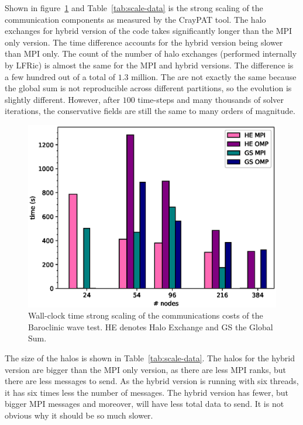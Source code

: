 Shown in figure~\ref{fig:comms_scale} and Table~\ref{tab:scale-data}
is the strong scaling of the communication components as measured by
the CrayPAT tool. The halo exchanges for hybrid version of the code
takes significantly longer than the MPI only version. The time
difference accounts for the hybrid version being slower than MPI only.
The count of the number of halo exchanges (performed internally by
LFRic) is almost the same for the MPI and hybrid versions. The
difference is a few hundred out of a total of $1.3$ million. The are
not exactly the same because the global sum is not reproducible across
different partitions, so the evolution is slightly different. However,
after $100$ time-steps and many thousands of solver iterations, the
conservative fields are still the same to many orders of magnitude.

\begin{figure}
\centering\includegraphics[width=1.0\linewidth]{figs/comms-scale.eps}
\caption{\label{fig:comms_scale}Wall-clock time strong scaling of the 
  communications costs of the Baroclinic wave test. HE denotes Halo
  Exchange and GS the Global Sum.}
\end{figure} 

The size of the halos is shown in Table~\ref{tab:scale-data}. The 
halos for the hybrid version are bigger than the MPI only version, as 
there are less MPI ranks, but there are less messages to send. As the 
hybrid version is running with six threads, it has six times less the 
number of messages. The hybrid version has fewer, but bigger MPI 
messages and moreover, will have less total data to send. It is not 
obvious why it should be so much slower. 

